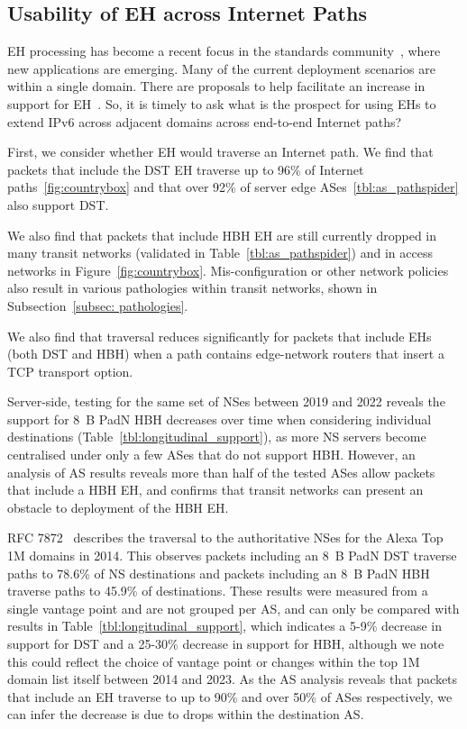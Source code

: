 \documentclass[conference]{IEEEtran}
\begin{document}
\subsection{Usability of EH across Internet Paths}

EH processing has become a recent focus in the standards community~\cite {ietf-v6ops-hbh-03}, where new applications are emerging. Many of the current deployment scenarios are within a single domain. There are proposals to help facilitate an increase in support for EH~\cite{ietf-6man-HBH-processing-06, ietf-6man-eh-limits-02}. 
So, it is timely to ask what is the prospect for using EHs to extend IPv6 across adjacent domains across end-to-end Internet paths?

First, we consider whether EH would traverse an Internet path.
We find that packets that include the DST EH traverse up to 96\% of Internet paths~\ref{fig:countrybox} and that over 92\% of server edge ASes~\ref{tbl:as_pathspider} also support DST.

We also find that packets that include HBH EH are still currently dropped in many transit networks (validated in Table~\ref{tbl:as_pathspider}) and in access networks in Figure~\ref{fig:countrybox}. Mis-configuration or other network policies also result in various pathologies within transit networks, shown in Subsection~\ref{subsec: pathologies}. 

We also find that traversal reduces significantly for packets that include EHs (both DST and HBH) when a path contains edge-network routers that insert a TCP transport option.

Server-side, testing for the same set of NSes between 2019 and 2022 reveals the support for 8~B PadN HBH decreases over time when considering individual destinations (Table~\ref{tbl:longitudinal_support}), as more NS servers become centralised under only a few ASes that do not support HBH.  However, an analysis of AS results reveals more than half of the tested ASes allow packets that include a HBH EH, and confirms that transit networks can present an obstacle to deployment of the HBH EH.

RFC 7872~\cite{RFC7872} describes the traversal to the authoritative NSes for the Alexa Top 1M domains in 2014. This observes packets including an 8~B PadN DST traverse paths to 78.6\% of NS destinations and packets including an 8~B PadN HBH traverse paths to 45.9\% of destinations. These results were measured from a single vantage point and are not grouped per AS, and can only be compared with results in Table~\ref{tbl:longitudinal_support}, which indicates a 5-9\% decrease in support for DST and a 25-30\% decrease in support for HBH, although we note this could reflect the choice of vantage point or changes within the top 1M domain list itself between 2014 and 2023.
As the AS analysis reveals that packets that include an EH traverse to up to 90\% and over 50\% of ASes respectively, we can infer the decrease is due to drops within the destination AS.
\end{document}
